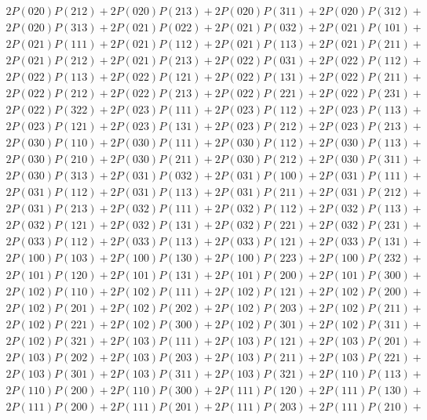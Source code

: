 \begin{align*}
	2P(020)P(212) + 2P(020)P(213) + 2P(020)P(311) + 2P(020)P(312)+ \\ 
	2P(020)P(313) + 2P(021)P(022) + 2P(021)P(032) + 2P(021)P(101)+ \\ 
	2P(021)P(111) + 2P(021)P(112) + 2P(021)P(113) + 2P(021)P(211)+ \\ 
	2P(021)P(212) + 2P(021)P(213) + 2P(022)P(031) + 2P(022)P(112)+ \\ 
	2P(022)P(113) + 2P(022)P(121) + 2P(022)P(131) + 2P(022)P(211)+ \\ 
	2P(022)P(212) + 2P(022)P(213) + 2P(022)P(221) + 2P(022)P(231)+ \\ 
	2P(022)P(322) + 2P(023)P(111) + 2P(023)P(112) + 2P(023)P(113)+ \\ 
	2P(023)P(121) + 2P(023)P(131) + 2P(023)P(212) + 2P(023)P(213)+ \\ 
	2P(030)P(110) + 2P(030)P(111) + 2P(030)P(112) + 2P(030)P(113)+ \\ 
	2P(030)P(210) + 2P(030)P(211) + 2P(030)P(212) + 2P(030)P(311)+ \\ 
	2P(030)P(313) + 2P(031)P(032) + 2P(031)P(100) + 2P(031)P(111)+ \\ 
	2P(031)P(112) + 2P(031)P(113) + 2P(031)P(211) + 2P(031)P(212)+ \\ 
	2P(031)P(213) + 2P(032)P(111) + 2P(032)P(112) + 2P(032)P(113)+ \\ 
	2P(032)P(121) + 2P(032)P(131) + 2P(032)P(221) + 2P(032)P(231)+ \\ 
	2P(033)P(112) + 2P(033)P(113) + 2P(033)P(121) + 2P(033)P(131)+ \\ 
	2P(100)P(103) + 2P(100)P(130) + 2P(100)P(223) + 2P(100)P(232)+ \\ 
	2P(101)P(120) + 2P(101)P(131) + 2P(101)P(200) + 2P(101)P(300)+ \\ 
	2P(102)P(110) + 2P(102)P(111) + 2P(102)P(121) + 2P(102)P(200)+ \\ 
	2P(102)P(201) + 2P(102)P(202) + 2P(102)P(203) + 2P(102)P(211)+ \\ 
	2P(102)P(221) + 2P(102)P(300) + 2P(102)P(301) + 2P(102)P(311)+ \\ 
	2P(102)P(321) + 2P(103)P(111) + 2P(103)P(121) + 2P(103)P(201)+ \\ 
	2P(103)P(202) + 2P(103)P(203) + 2P(103)P(211) + 2P(103)P(221)+ \\ 
	2P(103)P(301) + 2P(103)P(311) + 2P(103)P(321) + 2P(110)P(113)+ \\ 
	2P(110)P(200) + 2P(110)P(300) + 2P(111)P(120) + 2P(111)P(130)+ \\ 
	2P(111)P(200) + 2P(111)P(201) + 2P(111)P(203) + 2P(111)P(210)+ \\ 

\end{align*}
